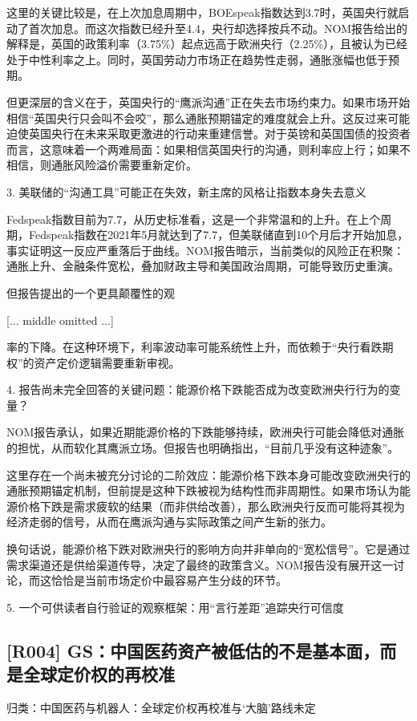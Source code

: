 \documentclass[11pt]{ctexart}
\begin{document}
这里的关键比较是，在上次加息周期中，BOEspeak指数达到3.7时，英国央行就启动了首次加息。而这次指数已经升至4.4，央行却选择按兵不动。NOM报告给出的解释是，英国的政策利率（3.75\%）起点远高于欧洲央行（2.25\%），且被认为已经处于中性利率之上。同时，英国劳动力市场正在趋势性走弱，通胀涨幅也低于预期。

但更深层的含义在于，英国央行的“鹰派沟通”正在失去市场约束力。如果市场开始相信“英国央行只会叫不会咬”，那么通胀预期锚定的难度就会上升。这反过来可能迫使英国央行在未来采取更激进的行动来重建信誉。对于英镑和英国国债的投资者而言，这意味着一个两难局面：如果相信英国央行的沟通，则利率应上行；如果不相信，则通胀风险溢价需要重新定价。

3. 美联储的“沟通工具”可能正在失效，新主席的风格让指数本身失去意义

Fedspeak指数目前为7.7，从历史标准看，这是一个非常温和的上升。在上个周期，Fedspeak指数在2021年5月就达到了7.7，但美联储直到10个月后才开始加息，事实证明这一反应严重落后于曲线。NOM报告暗示，当前类似的风险正在积聚：通胀上升、金融条件宽松，叠加财政主导和美国政治周期，可能导致历史重演。

但报告提出的一个更具颠覆性的观

[... middle omitted ...]

率的下降。在这种环境下，利率波动率可能系统性上升，而依赖于“央行看跌期权”的资产定价逻辑需要重新审视。

4. 报告尚未完全回答的关键问题：能源价格下跌能否成为改变欧洲央行行为的变量？

NOM报告承认，如果近期能源价格的下跌能够持续，欧洲央行可能会降低对通胀的担忧，从而软化其鹰派立场。但报告也明确指出，“目前几乎没有这种迹象”。

这里存在一个尚未被充分讨论的二阶效应：能源价格下跌本身可能改变欧洲央行的通胀预期锚定机制，但前提是这种下跌被视为结构性而非周期性。如果市场认为能源价格下跌是需求疲软的结果（而非供给改善），那么欧洲央行反而可能将其视为经济走弱的信号，从而在鹰派沟通与实际政策之间产生新的张力。

换句话说，能源价格下跌对欧洲央行的影响方向并非单向的“宽松信号”。它是通过需求渠道还是供给渠道传导，决定了最终的政策含义。NOM报告没有展开这一讨论，而这恰恰是当前市场定价中最容易产生分歧的环节。

5. 一个可供读者自行验证的观察框架：用“言行差距”追踪央行可信度

\subsection{[R004] GS：中国医药资产被低估的不是基本面，而是全球定价权的再校准}
{\small\color{refgray}归类：中国医药与机器人：全球定价权再校准与‘大脑’路线未定}
\end{document}
